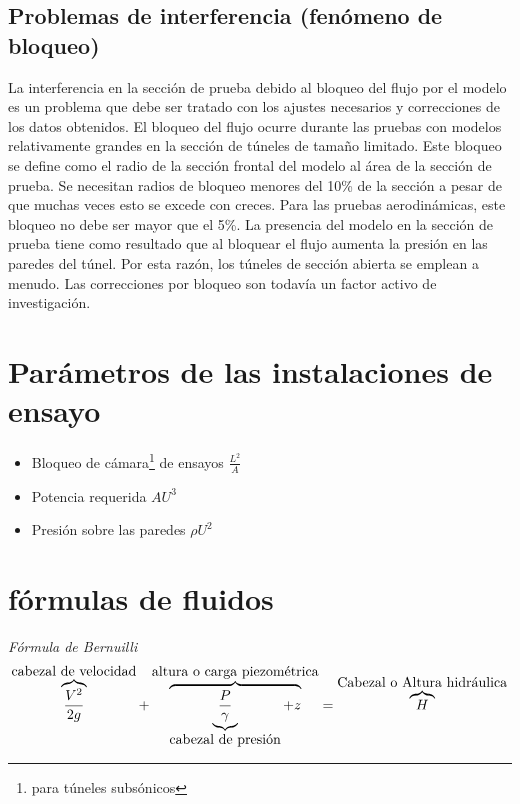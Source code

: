 \documentclass[10pt,a4paper]{article}
\begin{document}
\subsection{Problemas de interferencia (fenómeno de bloqueo)}
La interferencia en la sección de prueba debido al bloqueo del flujo por el modelo es un problema que debe ser tratado con los ajustes necesarios y correcciones de los datos obtenidos. El bloqueo del flujo ocurre durante las pruebas con modelos relativamente grandes en la sección de túneles de tamaño limitado. Este bloqueo se define como el radio de la sección frontal del modelo al área de la sección de prueba. Se necesitan radios de bloqueo menores del 10\% de la sección a pesar de que muchas veces esto se excede con creces. Para las pruebas aerodinámicas, este bloqueo no debe ser mayor que el 5\%. La presencia del modelo en la sección de prueba tiene como resultado que al bloquear el flujo aumenta la presión en las paredes del túnel. Por esta razón, los túneles de sección abierta se emplean a menudo. Las correcciones por bloqueo son todavía un factor activo de investigación.
\section{Parámetros de las instalaciones de ensayo}

\begin{itemize}
\item
 Bloqueo de cámara\footnote{para túneles subsónicos}  de ensayos $\frac{L^{2}}{A}$
\item
Potencia requerida $AU^{3}$
\item
Presión sobre las paredes \cite{balas} $\rho U^{2}$
\end{itemize}
\section{fórmulas de fluidos}
\textit{Fórmula de Bernuilli}
\begin{equation}
\label{bernu}
\overbrace{{V^2 \over 2 g}}^{\mbox{cabezal de velocidad}}+\overbrace{\underbrace{\frac{P}{\gamma}}_{\mbox{cabezal de presión}} + z}^{\mbox{altura o carga piezométrica}} = \overbrace{H}^{\mbox{Cabezal o Altura hidráulica}}
\end{equation}
\vspace{2cm}
\end{document}
